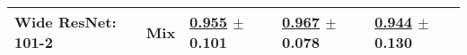 \begin{tabular}{lllll}
Wide ResNet: 101-2 & Mix & \underline{\textbf{\textcolor[rgb]{0.0000000000,0.5000000000,0}{0.955}}} $\pm$ \textbf{\textcolor[rgb]{0.0000000000,0.5000000000,0}{0.101}} & \underline{\textcolor[rgb]{0.2857142857,0.5000000000,0}{0.967}} $\pm$ \textcolor[rgb]{0.6587771166,0.3412228834,0}{0.078} & \underline{\textcolor[rgb]{1.0000000000,0.0000000000,0}{0.944}} $\pm$ \textcolor[rgb]{1.0000000000,0.0000000000,0}{0.130} \\
\bottomrule
\end{tabular}

